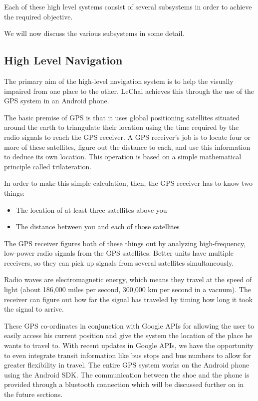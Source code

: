 \documentclass[11pt]{report}
\begin{document}
Each of these high level systems consist of several subsystems in order to achieve the required objective. 

We will now discuss the various subsystems in some detail.

\subsection{High Level Navigation}

The primary aim of the high-level navigation system is to help the visually impaired from one place to the other. LeChal achieves this through the use of the GPS system in an Android phone. 

The basic premise of GPS is that it uses global positioning satellites situated around the earth to triangulate their location using the time required by the radio signals to reach the GPS receiver\cite{gps}. A GPS receiver's job is to locate four or more of these satellites, figure out the distanc­e to each, and use this information to deduce its own location. This operation is based on a simple mathematical principle called trilateration. 

In order to make this simple calculation, then, the GPS receiver has to know two things:
\begin{itemize}
\item The location of at least three satellites above you
\item The distance between you and each of those satellites
\end{itemize}

The GPS receiver figures both of these things out by analyzing high-frequency, low-power radio signals from the GPS satellites. Better units have multiple receivers, so they can pick up signals from several satellites simultaneously.

Radio waves are electromagnetic energy, which means they travel at the speed of light (about 186,000 miles per second, 300,000 km per second in a vacuum). The receiver can figure out how far the signal has traveled by timing how long it took the signal to arrive. 

These GPS co-ordinates in conjunction with Google APIs for allowing the user to easily access his current position and give the system the location of the place he wants to travel to. With recent updates in Google APIs, we have the opportunity to even integrate transit information like bus stops and bus numbers to allow for greater flexibility in travel. The entire GPS system works on the Android phone using the Android SDK. The communication between the shoe and the phone is provided through a bluetooth connection which will be discussed further on in the future sections.
\end{document}
